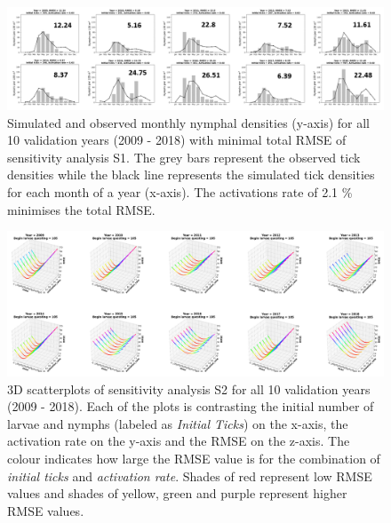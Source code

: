 \documentclass[a4paper, 11pt]{scrartcl}
\begin{document}
\begin{figure}
\centering
\includegraphics[width=\linewidth]{figures/initial_ticks_with_beech.png}
\caption{Simulated and observed monthly nymphal densities (y-axis) for all 10 validation years (2009 - 2018) with minimal total RMSE of sensitivity analysis S1. The grey bars
represent the observed tick densities while the black line represents the simulated tick densities for each month of a year (x-axis). The activations rate of 2.1 \% minimises
the total RMSE.}
\label{fig:initial_ticks_with_beech_rotated}
\end{figure}

\begin{figure}
\centering
\includegraphics[width=\linewidth]{figures/initial_ticks_without_beech_error.png}
\caption{3D scatterplots of sensitivity analysis S2 for all 10 validation years (2009 - 2018). Each of the plots is contrasting the initial number of larvae and nymphs
(labeled as \textit{Initial Ticks}) on the x-axis, the activation rate on the y-axis and the RMSE on the z-axis. The colour indicates how large the RMSE value is for the
combination of \textit{initial ticks} and \textit{activation rate}. Shades of red represent low RMSE values and shades of yellow, green and purple represent higher RMSE values.}
\label{fig:initial_ticks_without_beech_error_rotated}
\end{figure}
\end{document}
